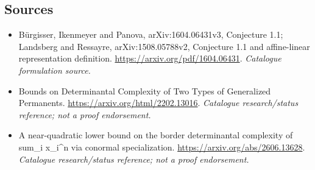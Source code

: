 \documentclass[11pt,a4paper]{article}
\numberwithin{equation}{section}
\begin{document}
\subsection{Sources}
\begin{itemize}\raggedright
\item[\textnormal{[S1]}]\hypertarget{source:statement:1}{} Bürgisser, Ikenmeyer and Panova, arXiv:1604.06431v3, Conjecture 1.1; Landsberg and Ressayre, arXiv:1508.05788v2, Conjecture 1.1 and affine-linear representation definition.
\url{https://arxiv.org/pdf/1604.06431}.
{\small\textit{Catalogue formulation source.}}
\item[\textnormal{[S2]}]\hypertarget{source:statement:2}{} Bounds on Determinantal Complexity of Two Types of Generalized Permanents.
\url{https://arxiv.org/html/2202.13016}.
{\small\textit{Catalogue research/status reference; not a proof endorsement.}}
\item[\textnormal{[S3]}]\hypertarget{source:statement:3}{} A near-quadratic lower bound on the border determinantal complexity of sum\_i x\_i\textasciicircum{}n via conormal specialization.
\url{https://arxiv.org/abs/2606.13628}.
{\small\textit{Catalogue research/status reference; not a proof endorsement.}}


\end{itemize}
\end{document}

